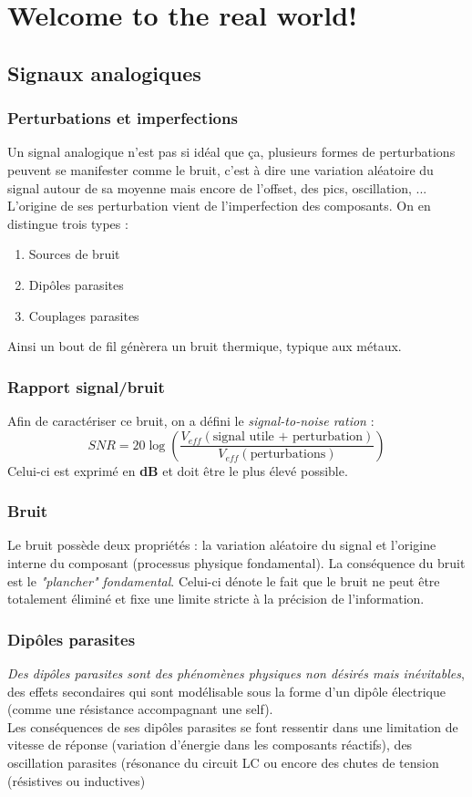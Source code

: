 \chapter{Welcome to the real world!}

\section{Signaux analogiques}
\subsection{Perturbations et imperfections}
Un signal analogique n'est pas si idéal que ça, plusieurs formes de perturbations peuvent se manifester comme le bruit, c'est à dire une variation aléatoire du signal autour de sa moyenne mais encore de l'offset, des pics, oscillation, ...\\
L'origine de ses perturbation vient de l'imperfection des composants. On en distingue trois types :
\begin{enumerate}
\item Sources de bruit
\item Dipôles parasites
\item Couplages parasites
\end{enumerate}
Ainsi un bout de fil génèrera un bruit thermique, typique aux métaux.

\subsection{Rapport signal/bruit}
Afin de caractériser ce bruit, on a défini le \textit{signal-to-noise ration} :
\begin{equation}
SNR = 20\log\left(\dfrac{V_{eff}(\text{signal utile + perturbation})}{V_{eff}(\text{perturbations})} \right)
\end{equation}
Celui-ci est exprimé en \textbf{dB} et doit être le plus élevé possible.

\subsection{Bruit}
Le bruit possède deux propriétés : la variation aléatoire du signal et l'origine interne du composant (processus physique fondamental). La conséquence du bruit est le \textit{"plancher" fondamental}. Celui-ci dénote le fait que le bruit ne peut être totalement éliminé et fixe une limite stricte à la précision de l'information.

\subsection{Dipôles parasites}
\textit{Des dipôles parasites sont des phénomènes physiques non désirés mais inévitables}, des effets secondaires qui sont modélisable sous la forme d'un dipôle électrique (comme une résistance accompagnant une self).\\
Les conséquences de ses dipôles parasites se font ressentir dans une limitation de vitesse de réponse (variation d'énergie dans les composants réactifs), des oscillation parasites (résonance du circuit LC ou encore des chutes de tension (résistives ou inductives)


